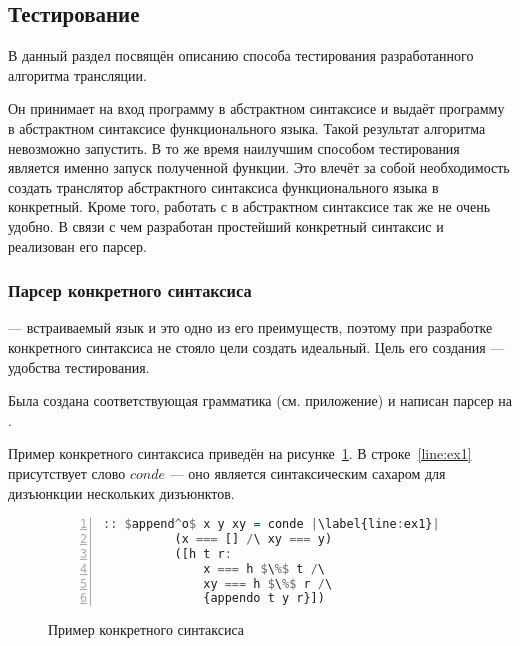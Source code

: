\subsection{Тестирование}

В данный раздел посвящён описанию способа тестирования разработанного алгоритма трансляции.

Он принимает на вход программу в абстрактном синтаксисе \miniKanren{} и выдаёт программу в абстрактном синтаксисе функционального языка.
Такой результат алгоритма невозможно запустить.
В то же время наилучшим способом тестирования является именно запуск полученной функции.
Это влечёт за собой необходимость создать транслятор абстрактного синтаксиса функционального языка в конкретный.
Кроме того, работать с \miniKanren{} в абстрактном синтаксисе так же не очень удобно.
В связи с чем разработан простейший конкретный синтаксис \miniKanren{} и реализован его парсер.


\subsubsection{Парсер конкретного синтаксиса \miniKanren{}}

\miniKanren{} --- встраиваемый язык и это одно из его преимуществ, поэтому при разработке конкретного синтаксиса не стояло цели создать идеальный.
Цель его создания --- удобства тестирования.

Была создана соответствующая грамматика (см. приложение) и написан парсер на \haskell{}.

Пример конкретного синтаксиса приведён на рисунке~\ref{lst:ex}.
В строке~\ref{line:ex1} присутствует слово $conde$ --- оно является синтаксическим сахаром для дизъюнкции нескольких дизъюнктов.

\begin{figure}[h!]
  \begin{center}
  \begin{minipage}{0.4\textwidth}
  \begin{lstlisting}[language=Haskell, frame=single, numbers=left,numberstyle=\small, firstnumber=1, escapechar=|]
        :: $append^o$ x y xy = conde |\label{line:ex1}|
          (x === [] /\ xy === y)
          ([h t r: 
              x === h $\%$ t /\
              xy === h $\%$ r /\
              {appendo t y r}])     
  \end{lstlisting}
  \end{minipage}
  \end{center}
  \caption{Пример конкретного синтаксиса \miniKanren{}}
  \label{lst:ex}
\end{figure}


